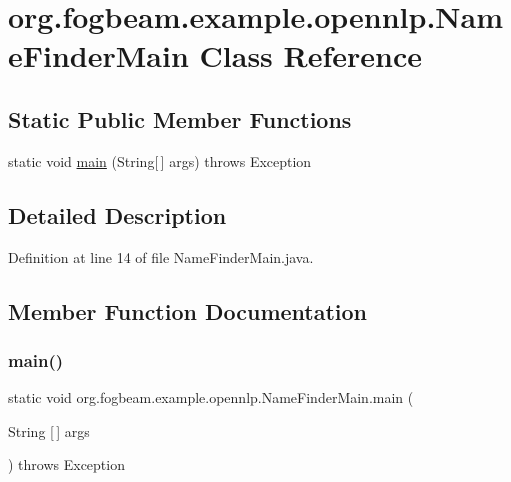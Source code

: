 \hypertarget{classorg_1_1fogbeam_1_1example_1_1opennlp_1_1_name_finder_main}{}\section{org.\+fogbeam.\+example.\+opennlp.\+Name\+Finder\+Main Class Reference}
\label{classorg_1_1fogbeam_1_1example_1_1opennlp_1_1_name_finder_main}
\subsection*{Static Public Member Functions}
\begin{DoxyCompactItemize}
\item 
static void \hyperlink{classorg_1_1fogbeam_1_1example_1_1opennlp_1_1_name_finder_main_a48247d65390730211c23c41f939c055a}{main} (String\mbox{[}$\,$\mbox{]} args)  throws Exception 	
\end{DoxyCompactItemize}


\subsection{Detailed Description}


Definition at line 14 of file Name\+Finder\+Main.\+java.



\subsection{Member Function Documentation}
\hypertarget{classorg_1_1fogbeam_1_1example_1_1opennlp_1_1_name_finder_main_a48247d65390730211c23c41f939c055a}{}\label{classorg_1_1fogbeam_1_1example_1_1opennlp_1_1_name_finder_main_a48247d65390730211c23c41f939c055a} 
\subsubsection{\texorpdfstring{main()}{main()}}
{\footnotesize\ttfamily static void org.\+fogbeam.\+example.\+opennlp.\+Name\+Finder\+Main.\+main (\begin{DoxyParamCaption}\item[{String \mbox{[}$\,$\mbox{]}}]{args }\end{DoxyParamCaption}) throws Exception\hspace{0.3cm}{\ttfamily [static]}}


